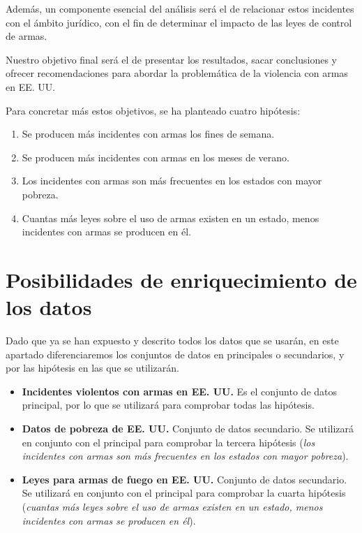 \documentclass[11pt,a4paper]{article}
\begin{document}
Además, un componente esencial del análisis será el de relacionar estos incidentes con el ámbito jurídico, con el fin de determinar el impacto de las leyes de control de armas.

Nuestro objetivo final será el de presentar los resultados, sacar conclusiones y ofrecer recomendaciones para abordar la problemática de la violencia con armas en EE. UU.

Para concretar más estos objetivos, se ha planteado cuatro hipótesis:

\begin{enumerate}
    \item Se producen más incidentes con armas los fines de semana.
    \item Se producen más incidentes con armas en los meses de verano.
    \item Los incidentes con armas son más frecuentes en los estados con mayor pobreza.
    \item Cuantas más leyes sobre el uso de armas existen en un estado, menos incidentes con armas se producen en él. 
\end{enumerate}

\section{Posibilidades de enriquecimiento de los datos}

Dado que ya se han expuesto y descrito todos los datos que se usarán, en este apartado diferenciaremos los conjuntos de datos en principales o secundarios, y por las hipótesis en las que se utilizarán.

\begin{itemize}
    \item \textbf{Incidentes violentos con armas en EE. UU.} Es el conjunto de datos principal, por lo que se utilizará para comprobar todas las hipótesis.
    \item \textbf{Datos de pobreza de EE. UU.} Conjunto de datos secundario. Se utilizará en conjunto con el principal para comprobar la tercera hipótesis (\textit{los incidentes con armas son más frecuentes en los estados con mayor pobreza}).
    \item \textbf{Leyes para armas de fuego en EE. UU.} Conjunto de datos secundario. Se utilizará en conjunto con el principal para comprobar la cuarta hipótesis (\textit{cuantas más leyes sobre el uso de armas existen en un estado, menos incidentes con armas se producen en él}).
\end{itemize}
\end{document}
